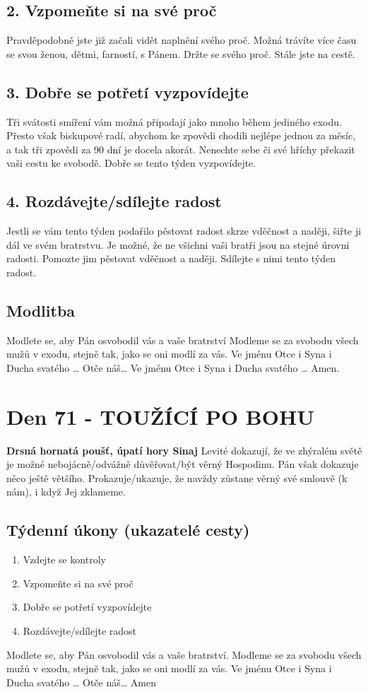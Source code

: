 \documentclass[11pt]{article}
\newcommand{\zacatekJedenactyTyden}{
\textbf{Drsná hornatá poušť, úpatí hory Sinaj} \newline 
Levité dokazují, že ve zhýralém světě je možné nebojácně/odvážně důvěřovat/být věrný Hospodinu. Pán však dokazuje něco ještě většího. Prokazuje/ukazuje, že navždy zůstane věrný své smlouvě (k nám), i když Jej zklameme.

\subsection*{Týdenní úkony (ukazatelé cesty)}
\begin{enumerate}
  \item Vzdejte se kontroly
  \item Vzpomeňte si na své proč
  \item Dobře se potřetí vyzpovídejte
  \item Rozdávejte/sdílejte radost
\end{enumerate}
Modlete se, aby Pán osvobodil vás a vaše bratrství. \newline
Modleme se za svobodu všech mužů v exodu, stejně tak, jako se oni modlí za vás.\newline
Ve jménu Otce i Syna i Ducha svatého …  Otče náš… Amen
}
\begin{document}
\subsection*{2. Vzpomeňte si na své proč}
Pravděpodobně jste již začali vidět naplnění svého proč. Možná trávíte více času se svou ženou, dětmi, farností, s Pánem. Držte se svého proč. Stále jste na cestě.
\subsection*{3. Dobře se potřetí vyzpovídejte}
Tři svátosti smíření vám možná připadají jako mnoho během jediného exodu. Přesto však biskupové radí, abychom ke zpovědi chodili nejlépe jednou za měsíc, a tak tři zpovědi za 90 dní je docela akorát. Nenechte sebe či své hříchy překazit vaši cestu ke svobodě. Dobře se tento týden vyzpovídejte.
\subsection*{4. Rozdávejte/sdílejte radost}
Jestli se vám tento týden podařilo pěstovat radost skrze vděčnost a naději, šiřte ji dál ve svém bratrstvu. Je možné, že ne všichni vaši bratři jsou na stejné úrovni radosti. Pomozte jim pěstovat vděčnost a naději. Sdílejte s nimi tento týden radost.
\subsection*{Modlitba}
Modlete se, aby Pán osvobodil vás a vaše bratrství \newline
Modleme se za svobodu všech mužů v exodu, stejně tak, jako se oni modlí za vás.\newline
Ve jménu Otce i Syna i Ducha svatého … Otče náš… Ve jménu Otce i Syna i Ducha svatého … Amen.
\newpage

\newpage
\section{Den 71 - TOUŽÍCÍ PO BOHU}
\zacatekJedenactyTyden
\end{document}
